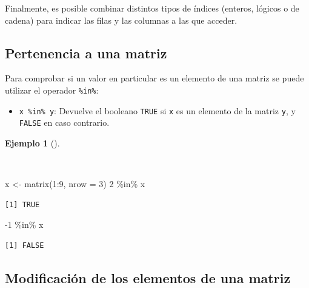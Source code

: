\documentclass[
  a4paper,
]{scrreport}
\newenvironment{Shaded}{\begin{snugshade}}{\end{snugshade}}
\newcommand{\AttributeTok}[1]{\textcolor[rgb]{0.40,0.45,0.13}{#1}}
\newcommand{\DecValTok}[1]{\textcolor[rgb]{0.68,0.00,0.00}{#1}}
\newcommand{\FunctionTok}[1]{\textcolor[rgb]{0.28,0.35,0.67}{#1}}
\newcommand{\NormalTok}[1]{\textcolor[rgb]{0.00,0.23,0.31}{#1}}
\newcommand{\OtherTok}[1]{\textcolor[rgb]{0.00,0.23,0.31}{#1}}
\newcommand{\SpecialCharTok}[1]{\textcolor[rgb]{0.37,0.37,0.37}{#1}}
\providecommand{\tightlist}{%
  \setlength{\itemsep}{0pt}\setlength{\parskip}{0pt}}\usepackage{longtable,booktabs,array}
\theoremstyle{definition}
\theoremstyle{definition}
\newtheorem{example}{Ejemplo}[chapter]
\theoremstyle{remark}
\begin{document}
Finalmente, es posible combinar distintos tipos de índices (enteros,
lógicos o de cadena) para indicar las filas y las columnas a las que
acceder.

\subsection{Pertenencia a una matriz}\label{pertenencia-a-una-matriz}

Para comprobar si un valor en particular es un elemento de una matriz se
puede utilizar el operador \texttt{\%in\%}:

\begin{itemize}
\tightlist
\item
  \texttt{x\ \%in\%\ y}: Devuelve el booleano \texttt{TRUE} si
  \texttt{x} es un elemento de la matriz \texttt{y}, y \texttt{FALSE} en
  caso contrario.
\end{itemize}

\begin{example}[]\protect\hypertarget{exm-pertenencia-matriz}{}\label{exm-pertenencia-matriz}

~

\begin{Shaded}
\begin{Highlighting}[]
\NormalTok{x }\OtherTok{\textless{}{-}} \FunctionTok{matrix}\NormalTok{(}\DecValTok{1}\SpecialCharTok{:}\DecValTok{9}\NormalTok{, }\AttributeTok{nrow =} \DecValTok{3}\NormalTok{)}
\DecValTok{2} \SpecialCharTok{\%in\%}\NormalTok{ x}
\end{Highlighting}
\end{Shaded}

\begin{verbatim}
[1] TRUE
\end{verbatim}

\begin{Shaded}
\begin{Highlighting}[]
\SpecialCharTok{{-}}\DecValTok{1} \SpecialCharTok{\%in\%}\NormalTok{ x}
\end{Highlighting}
\end{Shaded}

\begin{verbatim}
[1] FALSE
\end{verbatim}

\end{example}

\subsection{Modificación de los elementos de una
matriz}\label{modificaciuxf3n-de-los-elementos-de-una-matriz}
\end{document}
